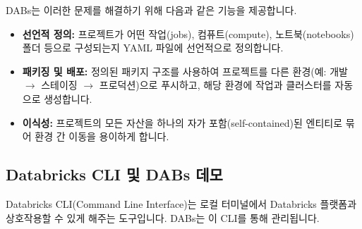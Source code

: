 \documentclass[11pt,a4paper]{article}
\begin{document}
DABs는 이러한 문제를 해결하기 위해 다음과 같은 기능을 제공합니다.
\begin{itemize}
    \item \textbf{선언적 정의:} 프로젝트가 어떤 작업(jobs), 컴퓨트(compute), 노트북(notebooks) 폴더 등으로 구성되는지 YAML 파일에 선언적으로 정의합니다.
    \item \textbf{패키징 및 배포:} 정의된 패키지 구조를 사용하여 프로젝트를 다른 환경(예: 개발 $\rightarrow$ 스테이징 $\rightarrow$ 프로덕션)으로 푸시하고, 해당 환경에 작업과 클러스터를 자동으로 생성합니다.
    \item \textbf{이식성:} 프로젝트의 모든 자산을 하나의 자가 포함(self-contained)된 엔티티로 묶어 환경 간 이동을 용이하게 합니다.
\end{itemize}

\subsection{Databricks CLI 및 DABs 데모}
Databricks CLI(Command Line Interface)는 로컬 터미널에서 Databricks 플랫폼과 상호작용할 수 있게 해주는 도구입니다. DABs는 이 CLI를 통해 관리됩니다.
\end{document}
